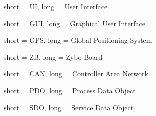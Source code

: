 {
	short = {UI},
	long = {User Interface}
}

{
	short = {GUI},
	long = {Graphical User Interface}
}

{
	short = {GPS},
	long = {Global Positioning System}
}

{
	short = {ZB},
	long = {Zybo Board}
}

{
	short = {CAN},
	long = {Controller Area Network}
}

{
	short = {PDO},
	long = {Process Data Object}
}

{
	short = {SDO},
	long = {Service Data Object}
}
